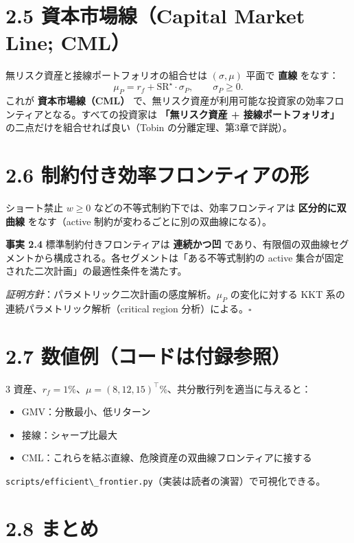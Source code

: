 \documentclass[11pt,a4paper]{report}
\begin{document}
\section{2.5 資本市場線（Capital Market Line; CML）}

無リスク資産と接線ポートフォリオの組合せは $(\sigma, \mu)$ 平面で \textbf{直線} をなす： \[ \mu_P = r_f + \mathrm{SR}^\star \cdot \sigma_P, \qquad \sigma_P \ge 0. \] これが \textbf{資本市場線（CML）} で、無リスク資産が利用可能な投資家の効率フロンティアとなる。すべての投資家は \textbf{「無リスク資産 + 接線ポートフォリオ」} の二点だけを組合せれば良い（Tobin の分離定理、第3章で詳説）。

\section{2.6 制約付き効率フロンティアの形}

ショート禁止 $w \ge 0$ などの不等式制約下では、効率フロンティアは \textbf{区分的に双曲線} をなす（active 制約が変わるごとに別の双曲線になる）。

\textbf{事実 2.4} 標準制約付きフロンティアは \textbf{連続かつ凹} であり、有限個の双曲線セグメントから構成される。各セグメントは「ある不等式制約の active 集合が固定された二次計画」の最適性条件を満たす。

\emph{証明方針}：パラメトリック二次計画の感度解析。$\mu_P$ の変化に対する KKT 系の連続パラメトリック解析（critical region 分析）による。$\square$

\section{2.7 数値例（コードは付録参照）}

3 資産、$r_f = 1\%$、$\mu = (8, 12, 15)^\top$\%、共分散行列を適当に与えると：
\begin{itemize}
\item GMV：分散最小、低リターン
\item 接線：シャープ比最大
\item CML：これらを結ぶ直線、危険資産の双曲線フロンティアに接する
\end{itemize}

\texttt{scripts/efficient\textbackslash{}\_frontier.py}（実装は読者の演習）で可視化できる。

\section{2.8 まとめ}
\end{document}
